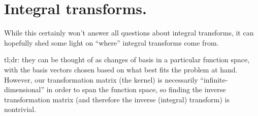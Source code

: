 \documentclass[letterpaper,12pt]{report}
\begin{document}











\section{Integral transforms.}

While this certainly won't answer all questions about integral transforms, it can hopefully
shed some light on ``where'' integral transforms come from.\par
tl;dr: they can be thought of as changes of basis in a particular function space,
with the basis vectors chosen based on what best fits the problem at hand.
However, our transformation matrix (the kernel) is necessarily ``infinite-dimensional''
in order to span the function space, so finding the inverse transformation matrix
(and therefore the inverse (integral) transform) is nontrivial.
\end{document}
